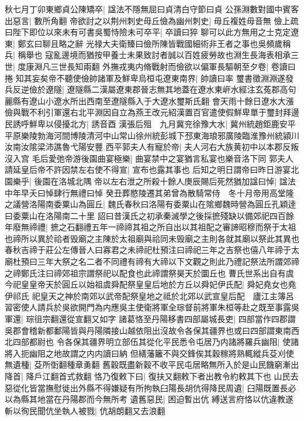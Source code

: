 秋七月丁卯東鄉貞公陳矯卒|{
	諡法不隱無屈曰貞清白守節曰貞}
公孫淵數對國中賓客出惡言|{
	數所角翻}
帝欲討之以荆州刺史毋丘儉為幽州刺史|{
	毋丘複姓毋音無}
儉上疏曰陛下即位以來未有可書吳蜀恃險未可卒平|{
	卒讀曰猝}
聊可以此方無用之士克定遼東|{
	鄭玄曰聊且略之辭}
光禄大夫衛臻曰儉所陳皆戰國細術非王者之事也吳頻歲稱兵|{
	稱舉也}
寇亂邊境而猶按甲養士未果致討者誠以百姓疲勞故也淵生長海表相承三世|{
	度康淵凡三世長知兩翻}
外撫戎夷内脩戰射而儉欲以偏軍長驅朝至夕卷|{
	卷讀曰捲}
知其妄矣帝不聽使儉帥諸軍及鮮卑烏桓屯遼東南界|{
	帥讀曰率}
璽書徵淵淵遂發兵反逆儉於遼隧|{
	遼隧縣二漢屬遼東郡晉志無其地蓋在遼水東㟁水經注玄菟郡高句麗縣有遼山小遼水所出西南至遼隧縣入于大遼水璽斯氏翻}
會天雨十餘日遼水大漲儉與戰不利引軍還右北平淵因自立為燕王改元紹漢置百官遣使假鮮卑單于璽封拜邊民誘呼鮮卑以侵擾北方|{
	誘音酉}
漢張后殂　九月冀兖徐豫大水|{
	冀州統趙鉅鹿安平平原樂陵勃海河間博陵清河中山常山徐州統彭城下邳東海琅邪廣陵臨淮豫州統潁川汝南汝隂梁沛譙魯弋陽安豐}
西平郭夫人有寵於帝|{
	夫人河右大族黄初中以本郡反叛沒入宫}
毛后愛弛帝游後園曲宴極樂|{
	曲宴禁中之宴猶言私宴也樂音洛下同}
郭夫人請延皇后帝不許因禁左右使不得宣|{
	宣布也露其事也}
后知之明日謂帝曰昨日游宴北園樂乎|{
	後園在洛城北隅}
帝以左右泄之所殺十餘人庚辰賜后死然猶加諡曰悼|{
	諡法中年早夭曰悼肆行無禮曰悼}
癸丑葬愍陵遷其弟曾為散騎常侍　冬十月帝用高堂隆之議營洛陽南委粟山為圓丘|{
	魏氏春秋曰洛陽有委粟山在隂鄉魏時營為圓丘孔穎逹曰委粟山在洛陽南二十里}
詔曰昔漢氏之初承秦滅學之後採摭殘缺以備郊祀四百餘年廢無禘禮|{
	摭之石翻禮五年一禘禘其祖之所自出以其祖配之審諦昭穆而祭于太祖也禘所以異於祫者毁廟之主陳於太祖廟與祫同未毁廟之主則各就其廟以祭此其異也春秋吉禘于莊公左傳晉人曰寡君之未禘祀杜預注曰禘祀三年之吉祭也僖八年禘于太廟杜預曰三年大祭之名二者不同禮有禘有大禘以下文觀之則此乃禮記祭法所謂郊禘之禘鄭氏注曰禘郊祖宗謂祭祀以配食也此禘謂祭昊天於圜丘也}
曹氏世系出自有虞今祀皇皇帝天於圓丘以始祖虞舜配祭皇皇后地於方丘以舜妃伊氏配|{
	舜妃堯女也堯伊祁氏}
祀皇天之神於南郊以武帝配祭皇地之祗於北郊以武宣皇后配　廬江主簿呂習密使人請兵於吳欲開門為内應吳主使衛將軍全琮督前將軍朱桓等赴之既至事露吳軍還|{
	琮徂宗翻還從宣翻又如字}
諸葛恪至丹陽移書四部屬城長吏|{
	四部當作四郡謂吳郡會稽新都鄱陽皆與丹陽隣接山越依阻出沒故令各保其疆界也或曰四部謂東南西北四部都尉也}
令各保其疆界明立部伍其從化平民悉令屯居乃内諸將羅兵幽阻|{
	使諸將入扼幽阻之地故謂之内内讀曰納}
但繕藩籬不與交鋒俟其穀稼將熟輒縱兵芟刈使無遺種|{
	芟所衘翻種章勇翻}
舊穀既盡新穀不收平民屯居略無所入於是山民饑窮漸出降首|{
	降戶江翻首式救翻}
恪乃復敕下曰|{
	復扶又翻敕下者出教令約敕其下也}
山民去惡從化皆當撫慰徙出外縣不得嫌疑有所拘執臼陽長胡伉得降民周遺|{
	臼陽既置長必以為縣其地當在丹陽郡而今無所考}
遺舊惡民|{
	困迫暫出伉}
縛送言府恪以伉違教遂斬以徇民聞伉坐執人被戮|{
	伉胡朗翻又去浪翻}
